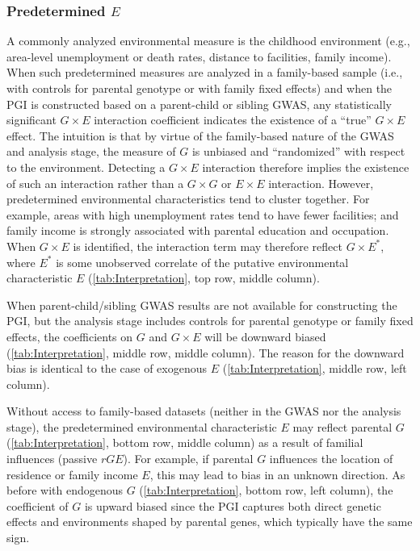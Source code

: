 \documentclass[12pt,a4paper]{article}
\begin{document}
\begin{bibunit}
\subsubsection{Predetermined \texorpdfstring{$E$}{}}
A commonly analyzed environmental measure is the childhood environment (e.g., area-level unemployment or death rates, distance to facilities, family income). When such predetermined measures are analyzed in a family-based sample (i.e., with controls for parental genotype or with family fixed effects) and when the PGI is constructed based on a parent-child or sibling GWAS, any statistically significant $G \times E$ interaction coefficient indicates the existence of a ``true'' $G \times E$ effect. The intuition is that by virtue of the family-based nature of the GWAS and analysis stage, the measure of $G$ is unbiased and ``randomized'' with respect to the environment. Detecting a $G \times E$ interaction therefore implies the existence of such an interaction rather than a $G \times G$ or $E \times E$ interaction. 
However, predetermined environmental characteristics tend to cluster together. For example, areas with high unemployment rates tend to have fewer facilities; and family income is strongly associated with parental education and occupation. When $G \times E$ is identified, the interaction term may therefore reflect $G \times E^*$, where $E^*$ is some unobserved correlate of the putative environmental characteristic $E$ (\autoref{tab:Interpretation}, top row, middle column).

When parent-child/sibling GWAS results are not available for constructing the PGI, but the analysis stage includes controls for parental genotype or family fixed effects, the coefficients on $G$ and $G \times E$ will be downward biased (\autoref{tab:Interpretation}, middle row, middle column). The reason for the downward bias is identical to the case of exogenous $E$ (\autoref{tab:Interpretation}, middle row, left column). 

Without access to family-based datasets (neither in the GWAS nor the analysis stage), the predetermined environmental characteristic $E$ may reflect parental $G$ (\autoref{tab:Interpretation}, bottom row, middle column) as a result of familial influences (passive $rGE$). For example, if parental $G$ influences the location of residence or family income $E$, this may lead to bias in an unknown direction. As before with endogenous $G$ (\autoref{tab:Interpretation}, bottom row, left column), the coefficient of $G$ is upward biased since the PGI captures both direct genetic effects and environments shaped by parental genes, which typically have the same sign. 


\end{bibunit}
\end{document}
